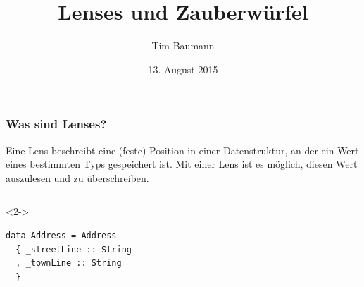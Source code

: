 \documentclass{beamer}
\title[Lens]{Lenses und Zauberwürfel}
\author{Tim Baumann}
\institute[CCA]{Curry Club Augsburg}
\date{13. August 2015}
\begin{document}
\begin{frame}
  \titlepage
\end{frame}

\begin{frame}[fragile]
  \frametitle{Was sind Lenses?}
  Eine Lens beschreibt eine (feste) Position in einer Datenstruktur, an der ein Wert eines bestimmten Typs gespeichert ist.
  Mit einer Lens ist es möglich, diesen Wert auszulesen und zu überschreiben.
  \begin{columns}[t]
    \begin{visibleenv}<2->
\begin{verbatim}
data Address = Address
  { _streetLine :: String
  , _townLine :: String
  }


\end{verbatim}
\end{visibleenv}
\end{columns}
\end{frame}
\end{document}
